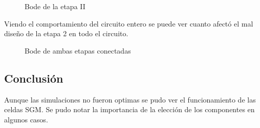 \begin{figure}[h]
 \centering
 \caption{Bode de la etapa II}
 \label{f:etapaIIbode}
\end{figure}

Viendo el comportamiento del circuito entero se puede ver cuanto afectó el mal diseño de la etapa 2 en todo el circuito.

\begin{figure}[h]
 \centering
 \caption{Bode de ambas etapas conectadas}
 \label{f:bodeSedra}
\end{figure}


\subsection{Conclusión}

Aunque las simulaciones no fueron optimas se pudo ver el funcionamiento de las celdas SGM. Se pudo notar la importancia de la elección de los componentes en algunos casos.

